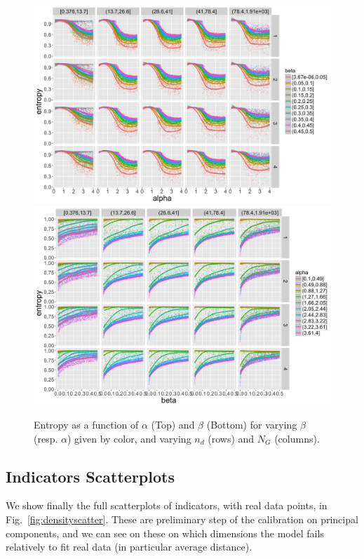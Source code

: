\begin{figure}
\centering
\includegraphics[width=\textwidth]{figuresraw/entropy_alpha}
\includegraphics[width=\textwidth]{figuresraw/entropy_beta}
\caption{Entropy as a function of $\alpha$ (Top) and $\beta$ (Bottom) for varying $\beta$ (resp. $\alpha$) given by color, and varying $n_d$ (rows) and $N_G$ (columns).}
\label{}
\end{figure}




\subsection*{Indicators Scatterplots}


We show finally the full scatterplots of indicators, with real data points, in Fig.~\ref{fig:densityscatter}. These are preliminary step of the calibration on principal components, and we can see on these on which dimensions the model fails relatively to fit real data (in particular average distance).


